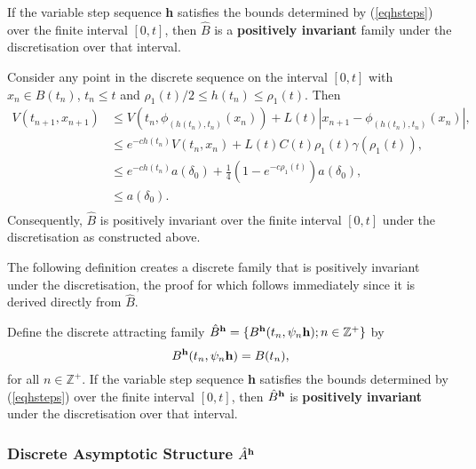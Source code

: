 \begin{lemma}
If the variable step sequence {\bf h} satisfies the bounds
determined by (\ref{eqhsteps}) over the finite interval $[0,t]$, then $\hat{B}$
is a {\bf positively invariant} family under the discretisation over that
interval.
\end{lemma}
\begin{prf}
Consider any point in the discrete sequence on the interval $[0,t]$ with
$x_n \in B(t_n)$, $t_n \leq t$  and $\rho_1(t)/2 \leq h(t_n) \leq
\rho_1(t)$. Then
\begin{align*}
  V(t_{n+1}, x_{n+1}) &\leq V(t_n, \phi_{(h(t_n), t_n)}(x_n)) + L(t)|x_{n+1} -
           \phi_{(h(t_n), t_n)}(x_n)|, \\
  &\leq e^{-ch(t_n)}V(t_n, x_n) + L(t)C(t)\rho_1(t) \gamma(\rho_1(t)), \\
  &\leq e^{-ch(t_n)} a(\delta_0) + \frac{1}{4}(1 - e^{-c\rho_1(t)}) a(\delta_0),
     \\
  &\leq a(\delta_0). \\
\end{align*}
Consequently, $\hat{B}$ is positively invariant  over the finite interval $[0,
t]$ under the discretisation as constructed above.
\end{prf}

The following definition creates a discrete family that is positively invariant
under the discretisation, the proof for which follows immediately since it is
derived directly from $\hat{B}$.

\begin{lemma}
Define the discrete attracting family $\hat{B}^{{\bf h}} = \{ B^{{\bf
h}}( t_n, \psi_n {\bf h}); n \in \mathbb{Z}^+ \}$ by
\begin{equation} \label{eqsdsdb}
  B^{{\bf h}}(t_n, \psi_n {\bf h}) = B(t_n),
\end{equation}
for all $n \in \mathbb{Z}^+$. If the variable step sequence
{\bf h} satisfies the bounds determined by (\ref{eqhsteps}) over the
finite interval $[0, t]$, then $\hat{B}^{{\bf h}}$ is \textbf{positively
invariant} under the discretisation over that interval.
\end{lemma}

\subsubsection{Discrete Asymptotic Structure $\hat{A}^{{\bf h}}$}

